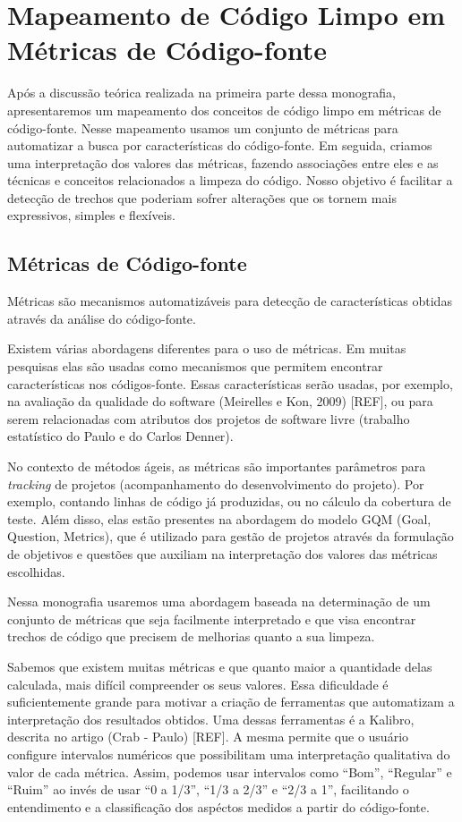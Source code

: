 \chapter{Mapeamento de Código Limpo em Métricas de Código-fonte}
\label{chap:mapeamento}	

	Após a discussão teórica realizada na primeira parte dessa 	monografia, apresentaremos um mapeamento dos conceitos de código limpo em métricas de código-fonte. Nesse mapeamento usamos um conjunto de métricas para automatizar a busca por características do código-fonte. Em seguida, criamos uma interpretação dos valores das métricas, fazendo associações entre eles e as técnicas e conceitos relacionados a limpeza do código. Nosso objetivo é facilitar a detecção de trechos que poderiam sofrer alterações que os tornem mais expressivos, simples e flexíveis.


\section{Métricas de Código-fonte}

	Métricas são mecanismos automatizáveis para detecção de características obtidas através da análise do código-fonte.
	
	Existem várias abordagens diferentes para o uso de métricas. Em muitas pesquisas elas são usadas como mecanismos que permitem encontrar características nos códigos-fonte. Essas características serão usadas, por exemplo, na avaliação da qualidade do software (Meirelles e Kon, 2009) [REF], ou para serem relacionadas com atributos dos projetos de software livre (trabalho estatístico do Paulo e do Carlos Denner). 
	
	No contexto de métodos ágeis, as métricas são importantes parâmetros para \textit{tracking} de projetos (acompanhamento do desenvolvimento do projeto). Por exemplo, contando linhas de código já produzidas, ou no cálculo da cobertura de teste.	Além disso, elas estão presentes na abordagem do modelo GQM (Goal, Question, Metrics), que é utilizado para gestão de projetos através da formulação de objetivos e questões que auxiliam na interpretação dos valores das métricas escolhidas.
	
	Nessa monografia usaremos uma abordagem baseada na determinação de um conjunto de métricas que seja facilmente interpretado e que visa encontrar trechos de código que precisem de melhorias quanto a sua limpeza.
	
	Sabemos que existem muitas métricas e que quanto maior a quantidade delas calculada, mais difícil compreender os seus valores. Essa dificuldade é suficientemente grande para motivar a criação de ferramentas que automatizam a interpretação dos resultados obtidos.	Uma dessas ferramentas é a Kalibro, descrita no artigo (Crab - Paulo) [REF]. A mesma permite que o usuário configure intervalos numéricos que possibilitam uma interpretação qualitativa do valor de cada métrica. Assim, podemos usar intervalos como ``Bom'', ``Regular'' e ``Ruim'' ao invés de usar ``0 a 1/3'', ``1/3 a 2/3'' e ``2/3 a 1'', facilitando o entendimento e a classificação dos aspéctos medidos a partir do código-fonte.
	
